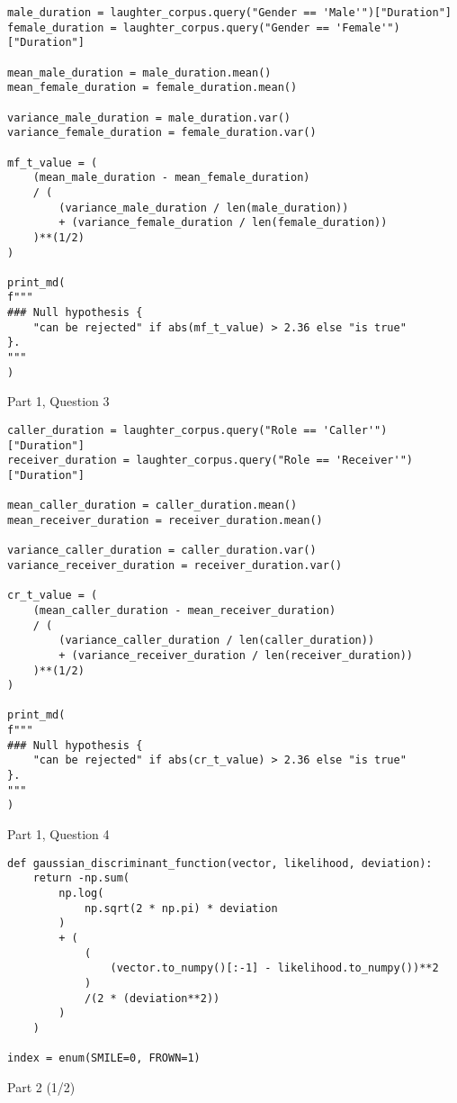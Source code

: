 \documentclass[12pt,a4paper]{article}
\begin{document}
\begin{listing}[h]
\begin{verbatim}
male_duration = laughter_corpus.query("Gender == 'Male'")["Duration"]
female_duration = laughter_corpus.query("Gender == 'Female'")["Duration"]

mean_male_duration = male_duration.mean()
mean_female_duration = female_duration.mean()

variance_male_duration = male_duration.var()
variance_female_duration = female_duration.var()

mf_t_value = (
    (mean_male_duration - mean_female_duration)
    / (
        (variance_male_duration / len(male_duration))
        + (variance_female_duration / len(female_duration))
    )**(1/2)
)

print_md(
f"""
### Null hypothesis {
    "can be rejected" if abs(mf_t_value) > 2.36 else "is true"
}.
"""
)
\end{verbatim}
\caption{Part 1, Question 3}
\end{listing}


\begin{listing}[h]
\begin{verbatim}
caller_duration = laughter_corpus.query("Role == 'Caller'")["Duration"]
receiver_duration = laughter_corpus.query("Role == 'Receiver'")["Duration"]

mean_caller_duration = caller_duration.mean()
mean_receiver_duration = receiver_duration.mean()

variance_caller_duration = caller_duration.var()
variance_receiver_duration = receiver_duration.var()

cr_t_value = (
    (mean_caller_duration - mean_receiver_duration)
    / (
        (variance_caller_duration / len(caller_duration))
        + (variance_receiver_duration / len(receiver_duration))
    )**(1/2)
)

print_md(
f"""
### Null hypothesis {
    "can be rejected" if abs(cr_t_value) > 2.36 else "is true"
}.
"""
)
\end{verbatim}
\caption{Part 1, Question 4}
\end{listing}


\begin{listing}[h]
\begin{verbatim}
def gaussian_discriminant_function(vector, likelihood, deviation):
    return -np.sum(
        np.log(
            np.sqrt(2 * np.pi) * deviation
        )
        + (
            (
                (vector.to_numpy()[:-1] - likelihood.to_numpy())**2
            )
            /(2 * (deviation**2))
        )
    )

index = enum(SMILE=0, FROWN=1)
\end{verbatim}
\caption{Part 2 (1/2)}
\end{listing}
\end{document}
